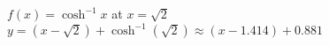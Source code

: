 {$f(x) = \cosh^{-1} x$ at $x=\sqrt 2$}
{$y=(x-\sqrt{2})+\cosh^{-1}(\sqrt{2}) \approx (x-1.414)+0.881$}
